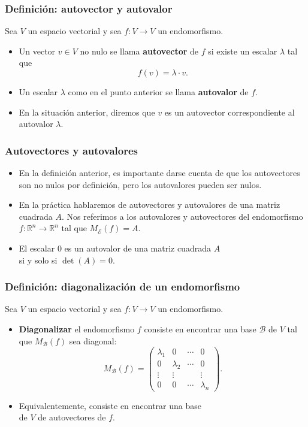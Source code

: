 \documentclass[12pt]{beamer}
\begin{document}
\begin{frame}
  \frametitle{Definición: autovector y autovalor}
  Sea $V$ un espacio vectorial y sea $f \colon V \to V$ un endomorfismo.
  \pause
  \begin{itemize}
    \item Un vector $v \in V$ {\color{red} no nulo} se llama \textbf{autovector} de $f$ si existe un escalar $\lambda$ tal que
      \[ f(v) = \lambda \cdot v. \]
      \pause
      \vspace{-8mm}
    \item Un escalar $\lambda$ como en el punto anterior se llama \textbf{autovalor} de $f$.
      \pause
    \item En la situación anterior,
      diremos que $v$ es un autovector correspondiente al autovalor $\lambda$.
  \end{itemize}

\end{frame}

\begin{frame}
  \frametitle{Autovectores y autovalores}
  \vspace{-8mm}
  \begin{itemize}
    \item En la definición anterior, es importante darse cuenta de que los autovectores son no nulos por definición, pero los autovalores pueden ser nulos.
      \pause
    \item En la práctica hablaremos de autovectores y autovalores de una matriz cuadrada $A$.
      Nos referimos a los autovalores y autovectores del endomorfismo $f \colon \mathbb{R}^{n} \to \mathbb{R}^{n}$ tal que $M_{\mathcal{E}}(f) = A$.
      \pause
    \item El escalar $0$ es un autovalor de una matriz cuadrada $A$ \\
      si y solo si $\det(A) = 0$.
  \end{itemize}
\end{frame}


\begin{frame}
  \frametitle{Definición: diagonalización de un endomorfismo}
  Sea $V$ un espacio vectorial y sea $f \colon V \to V$ un endomorfismo.
  \pause
  \begin{itemize}
    \item \textbf{Diagonalizar} el endomorfismo $f$ consiste en encontrar una base $\mathcal{B}$ de $V$ tal que $M_{\mathcal{B}}(f)$ sea diagonal:
      \[
        M_{\mathcal{B}}(f) =
        \begin{pmatrix}
          \lambda_{1} & 0 & \cdots & 0 \\
          0 & \lambda_{2} & \cdots & 0 \\
          \vdots & \vdots &  & \vdots \\
          0 & 0 & \cdots & \lambda_{n}
        \end{pmatrix}.
      \]
      \pause
    \item Equivalentemente, consiste en encontrar una base \\
      de $V$ de autovectores de $f$.
  \end{itemize}
\end{frame}
\end{document}

